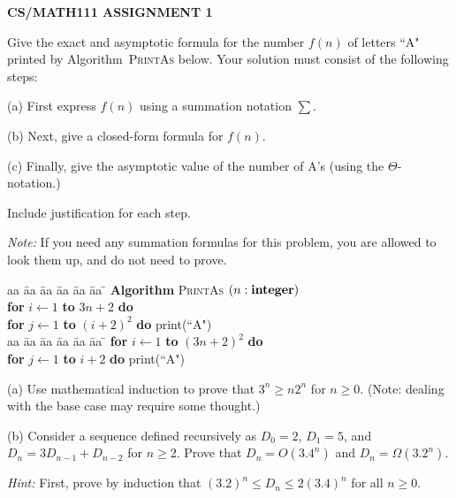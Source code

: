 \documentclass{article}
\begin{document}
\centerline{\large \bf CS/MATH111 ASSIGNMENT 1}

\vskip 0.3in


\begin{problem}
Give the exact and asymptotic formula for the number $f(n)$ of
letters ``A" printed by Algorithm~\textsc{PrintAs} below.
Your solution must consist of the following steps:
%
\begin{description}
\item{(a)} First express $f(n)$ using a summation notation $\sum$.
\item{(b)} Next, give a closed-form formula for $f(n)$.
\item{(c)}  Finally, give the asymptotic value of the
number of A's (using the $\Theta$-notation.)
\end{description}
\noindent
Include justification for each step. 

\smallskip
\noindent
\emph{Note:} If you need any summation formulas for this problem, you are allowed to look them up, and do not need to prove.

\begin{tabbing}
aa \= aa \= aa \= aa \= aa \= aa \= \kill
\textbf{Algorithm} \textsc{PrintAs} $(n: \mbox{\bf integer})$ \\
      \> \textbf{for} $i \leftarrow 1$ \textbf{to} $3n+2$
                         \textbf{do} \\
      \> \> \textbf{for} $j \leftarrow 1$ \textbf{to} $(i+2)^2$ \textbf{do} print(``A")\\
      
aa \= aa \= aa \= aa \= aa \= aa \= \kill
      \> \textbf{for} $i \leftarrow 1$ \textbf{to} $(3n+2)^2$
                         \textbf{do} \\
      \> \> \textbf{for} $j \leftarrow 1$ \textbf{to} $i+2$ \textbf{do} print(``A")
\end{tabbing}




\end{problem}


\begin{problem}
(a) Use mathematical induction to prove that $3^n \ge n2^n$ for $n\ge 0$. 
(Note: dealing with the base case may require some thought.)

\smallskip
\noindent (b) Consider a sequence defined recursively as
$D_0 = 2$, $D_1 = 5$, and $D_n = 3D_{n-1}+D_{n-2}$ for
$n\ge 2$. Prove that $D_n = O(3.4^n)$ and $D_n = \Omega(3.2^n)$.

\smallskip
\noindent
\emph{Hint:} 
First, prove by induction that $(3.2)^n \le D_n \le 2(3.4)^n$ for all $n\ge 0$.
\end{problem}
\end{document}
